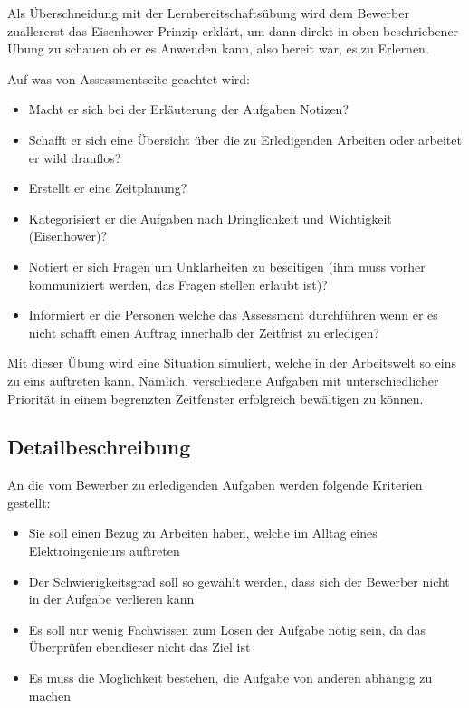 Als Überschneidung mit der Lernbereitschaftsübung wird dem Bewerber zuallererst das Eisenhower-Prinzip erklärt, um dann direkt in oben beschriebener Übung zu schauen ob er es Anwenden kann, also bereit war, es zu Erlernen. 

Auf was von Assessmentseite geachtet wird:
\begin{itemize}
\item Macht er sich bei der Erläuterung der Aufgaben Notizen?
\item Schafft er sich eine Übersicht über die zu Erledigenden Arbeiten oder arbeitet er wild drauflos?
\item Erstellt er eine Zeitplanung?
\item Kategorisiert er die Aufgaben nach Dringlichkeit und Wichtigkeit (Eisenhower)?
\item Notiert er sich Fragen um Unklarheiten zu beseitigen (ihm muss vorher kommuniziert werden, das Fragen stellen erlaubt ist)?
\item Informiert er die Personen welche das Assessment durchführen wenn er es nicht schafft einen Auftrag innerhalb der Zeitfrist zu erledigen?
\end{itemize}

Mit dieser Übung wird eine Situation simuliert, welche in der Arbeitswelt so eins zu eins auftreten kann. Nämlich, verschiedene Aufgaben mit unterschiedlicher Priorität in einem begrenzten Zeitfenster erfolgreich bewältigen zu können.

\subsection{Detailbeschreibung}

An die vom Bewerber zu erledigenden Aufgaben werden folgende Kriterien gestellt:

\begin{itemize}
\item Sie soll einen Bezug zu Arbeiten haben, welche im Alltag eines Elektroingenieurs auftreten
\item Der Schwierigkeitsgrad soll so gewählt werden, dass sich der Bewerber nicht in der Aufgabe verlieren kann \item Es soll nur wenig Fachwissen zum Lösen der Aufgabe nötig sein, da das Überprüfen ebendieser nicht das Ziel ist
\item Es muss die Möglichkeit bestehen, die Aufgabe von anderen abhängig zu machen
\end{itemize}

